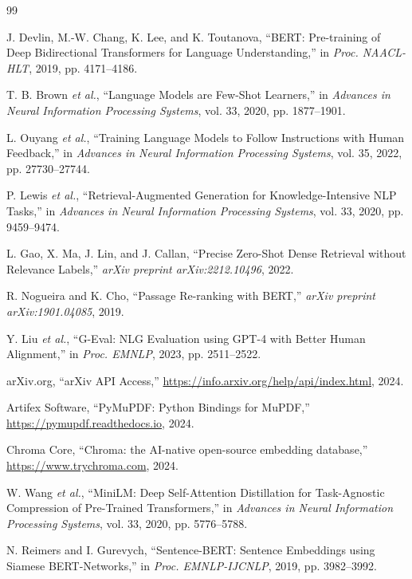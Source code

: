 \documentclass[12pt, a4paper]{article}
\begin{document}
\begin{thebibliography}{99}

J. Devlin, M.-W. Chang, K. Lee, and K. Toutanova,
``BERT: Pre-training of Deep Bidirectional Transformers for Language Understanding,''
in \textit{Proc. NAACL-HLT}, 2019, pp. 4171--4186.

T. B. Brown \textit{et al.},
``Language Models are Few-Shot Learners,''
in \textit{Advances in Neural Information Processing Systems}, vol. 33, 2020,
pp. 1877--1901.

L. Ouyang \textit{et al.},
``Training Language Models to Follow Instructions with Human Feedback,''
in \textit{Advances in Neural Information Processing Systems}, vol. 35, 2022,
pp. 27730--27744.

P. Lewis \textit{et al.},
``Retrieval-Augmented Generation for Knowledge-Intensive NLP Tasks,''
in \textit{Advances in Neural Information Processing Systems}, vol. 33, 2020,
pp. 9459--9474.

L. Gao, X. Ma, J. Lin, and J. Callan,
``Precise Zero-Shot Dense Retrieval without Relevance Labels,''
\textit{arXiv preprint arXiv:2212.10496}, 2022.

R. Nogueira and K. Cho,
``Passage Re-ranking with BERT,''
\textit{arXiv preprint arXiv:1901.04085}, 2019.

Y. Liu \textit{et al.},
``G-Eval: NLG Evaluation using GPT-4 with Better Human Alignment,''
in \textit{Proc. EMNLP}, 2023, pp. 2511--2522.

arXiv.org,
``arXiv API Access,''
\url{https://info.arxiv.org/help/api/index.html}, 2024.

Artifex Software,
``PyMuPDF: Python Bindings for MuPDF,''
\url{https://pymupdf.readthedocs.io}, 2024.

Chroma Core,
``Chroma: the AI-native open-source embedding database,''
\url{https://www.trychroma.com}, 2024.

W. Wang \textit{et al.},
``MiniLM: Deep Self-Attention Distillation for Task-Agnostic Compression
of Pre-Trained Transformers,''
in \textit{Advances in Neural Information Processing Systems}, vol. 33, 2020,
pp. 5776--5788.

N. Reimers and I. Gurevych,
``Sentence-BERT: Sentence Embeddings using Siamese BERT-Networks,''
in \textit{Proc. EMNLP-IJCNLP}, 2019, pp. 3982--3992.


\end{thebibliography}
\end{document}
